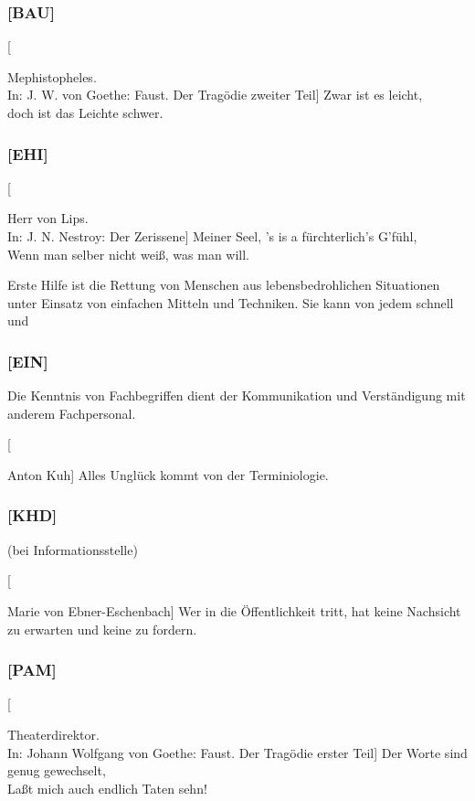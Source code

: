 \documentclass[
ngerman,
paper=a4,
asymmetric,
fontsize=10pt,
draft=false,
numbers=noenddot,
bibtotocnumbered,
footnotes=multiple,
]{scrreprt}
\newcommand{\Dictum}[2][]{
  \bigskip
  \begin{flushright}
  \begin{minipage}{\ThirdNetWidth}\scriptsize
  {\ttfamily\sloppy\color{AltBlueDark}#2}\vspace{\baselineskip}
  
  {\FontSansNarrowFamily\color{AltBlueVeryLight}#1}
  \end{minipage}
  \end{flushright}
  \bigskip\noindent
  }
\begin{document}
\subsubsection{[BAU]}



\Dictum
[Mephistopheles. \\
In: J. W. von Goethe: Faust. Der Tragödie zweiter Teil]
{Zwar ist es leicht,\\
doch ist das Leichte schwer.}

\subsubsection{[EHI]}

\Dictum
[Herr von Lips.\\
In: J. N. Nestroy: Der Zerissene]
{Meiner Seel, 's is a fürchterlich's G'fühl,\\
Wenn man selber nicht weiß, was man will.}

Erste Hilfe ist die Rettung von Menschen aus
lebensbedrohlichen Situationen unter Einsatz von einfachen
Mitteln und Techniken. Sie kann von jedem schnell und


\subsubsection{[EIN]}

Die Kenntnis von Fachbegriffen dient der Kommunikation und
Verständigung mit anderem Fachpersonal.

\Dictum
[Anton Kuh]
{Alles Unglück kommt von der Terminiologie.}



\subsubsection{[KHD] }(bei Informationsstelle)



\Dictum
[Marie von Ebner-Eschenbach]
{Wer in die Öffentlichkeit tritt, hat keine Nachsicht zu erwarten und keine zu fordern.}

\subsubsection{[PAM]}


\Dictum
[Theaterdirektor. \\
In: Johann Wolfgang von Goethe: Faust. Der Tragödie erster Teil]
{Der Worte sind genug gewechselt,\\
Laßt mich auch endlich Taten sehn!}
\end{document}
